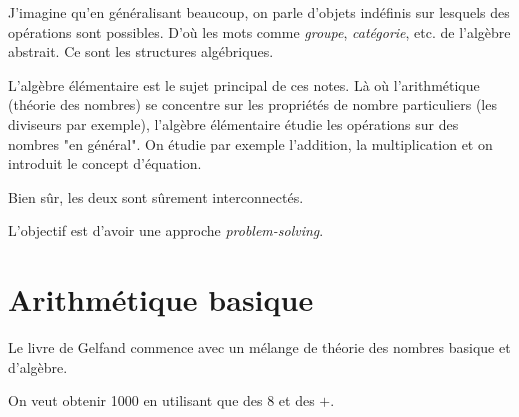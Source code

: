 \documentclass[fleqn,a4paper,nobib]{tufte-handout}
\begin{document}
J'imagine qu'en généralisant beaucoup, on parle d'objets indéfinis
sur lesquels des opérations sont possibles. D'où les mots comme
\textit{groupe}, \textit{catégorie}, etc. de l'algèbre abstrait.
Ce sont les structures algébriques.

L'algèbre élémentaire est le sujet principal de ces notes.
Là où l'arithmétique (théorie des nombres) se concentre sur les
propriétés de nombre particuliers (les diviseurs par exemple),
l'algèbre élémentaire étudie les opérations sur des nombres "en général".
On étudie par exemple l'addition, la multiplication et
on introduit le concept d'équation.

Bien sûr, les deux sont sûrement interconnectés.

L'objectif est d'avoir une approche \textit{problem-solving}.

\section{Arithmétique basique}

Le livre de Gelfand commence avec un mélange de théorie des
nombres basique et d'algèbre.






\begin{exercise}
    On veut obtenir 1000 en utilisant que des 8 et des $+$.
\end{exercise}
\end{document}

